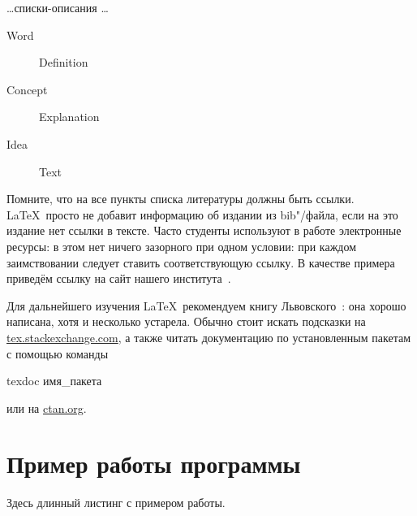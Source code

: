 \dots списки-описания \dots

\begin{description}
  \item[Word] Definition
  \item[Concept] Explanation
  \item[Idea] Text
\end{description}

\Conc

Помните, что на все пункты списка литературы должны быть ссылки. \LaTeX\ просто не добавит информацию об издании из bib"/файла, если на это издание нет ссылки в тексте. Часто студенты используют в работе  электронные ресурсы: в этом нет ничего зазорного при одном условии: при каждом заимствовании следует ставить соответствующую ссылку. В качестве примера приведём ссылку на сайт нашего института~\autocite{mmcs}.

Для дальнейшего изучения \LaTeX\ рекомендуем книгу Львовского~\autocite{Lvo2003}: она хорошо написана, хотя и несколько устарела.
Обычно стоит искать подсказки на
\href{http://tex.stackexchange.com/}{tex.stackexchange.com}, а также
читать документацию по установленным пакетам с помощью
команды
\begin{Verb}
texdoc имя_пакета
\end{Verb}
или на \href{http://ctan.org/}{ctan.org}.

\printbibliography[%
    heading=bibintoc%
]

\appendix
{}

\section{Пример работы программы}

Здесь длинный листинг с примером работы.


